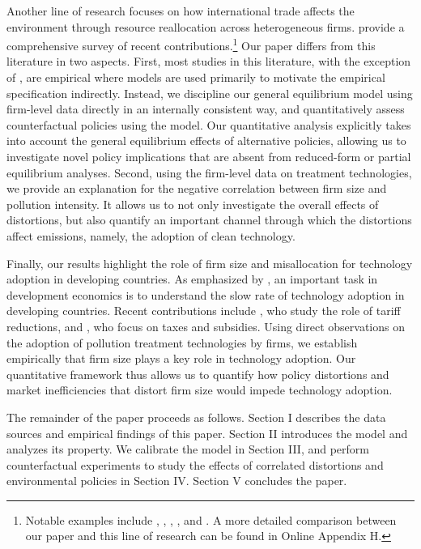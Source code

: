 \documentclass[AEJ]{AEA}
\begin{document}
Another line of research focuses on how international trade affects the environment through resource reallocation across heterogeneous firms. \citet{Cherniwchanetal:2017} provide a comprehensive survey of recent contributions.\footnote{Notable examples include \citet{Martin:2013}, \citet{Cherniwchan:2017}, \citet{BarrowsOllivier:2016}, \citet{Forslidetal:2015}, and \citet{ShapiroWalker:2015}. A more detailed comparison between our paper and this line of research can be found in Online Appendix H.} Our paper differs from this literature in two aspects. First, most studies in this literature, with the exception of \citet{ShapiroWalker:2015}, are empirical where models are used primarily to motivate the empirical specification indirectly. Instead, we discipline our general equilibrium model using firm-level data directly in an internally consistent way, and quantitatively assess counterfactual policies using the model. Our quantitative analysis explicitly takes into account the general equilibrium effects of alternative policies, allowing us to investigate novel policy implications that are absent from reduced-form or partial equilibrium analyses. Second, using the firm-level data on treatment technologies, we provide an explanation for the negative correlation between firm size and pollution intensity. It allows us to not only investigate the overall effects of distortions, but also quantify an important channel through which the distortions affect emissions, namely, the adoption of clean technology.

Finally, our results highlight the role of firm size and misallocation for technology adoption in developing countries. As emphasized by \citet{ParentePrescott:1994, ParentePrescott:1999}, an important task in development economics is to understand the slow rate of technology adoption in developing countries. Recent contributions include \citet{Bustos:2011}, who study the role of tariff reductions, and \citet{Acemogluetal:2012}, who focus on taxes and subsidies. Using direct observations on the adoption of pollution treatment technologies by firms, we establish empirically that firm size plays a key role in technology adoption. Our quantitative framework thus allows us to quantify how policy distortions and market inefficiencies that distort firm size would impede technology adoption.

The remainder of the paper proceeds as follows. Section I describes the data sources and empirical findings of this paper. Section II introduces the model and analyzes its property. We calibrate the model in Section III, and perform counterfactual experiments to study the effects of correlated distortions and environmental policies in Section IV. Section V concludes the paper.
\end{document}
